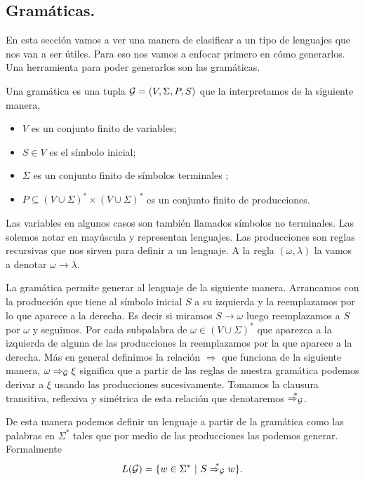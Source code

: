 \documentclass[tesis.tex]{subfiles}
\begin{document}
\subsection{Gramáticas.}
En esta sección vamos a ver una manera de clasificar a un tipo de lenguajes que nos van a ser útiles. Para eso nos vamos a enfocar primero en cómo generarlos. Una herramienta para poder generarlos son las gramáticas.

\begin{deff}
	Una gramática es una tupla ${\cal G} = (V, \Sigma, P, S)$ que la interpretamos de la siguiente manera,
\begin{itemize}
		\item $V$ es un conjunto finito de variables;
		\item $S \in V$ es el símbolo inicial;
		\item $\Sigma$ es un conjunto finito de símbolos terminales ;
		\item $P \subseteq (V \cup \Sigma)^* \times (V \cup \Sigma)^*$ es un conjunto finito de producciones.
\end{itemize}
\end{deff}

Las variables en algunos casos son también llamados símbolos no terminales. Las solemos notar en mayúscula y representan lenguajes. Las producciones son reglas recursivas que nos sirven para definir a un lenguaje. A la regla $(\omega, \lambda)$ la vamos a denotar $\omega \to \lambda$.

La gramática permite generar al lenguaje de la siguiente manera. Arrancamos con la producción que tiene al símbolo inicial $S$ a su izquierda y la reemplazamos por lo que aparece a la derecha. Es decir si miramos $S \to \omega$ luego reemplazamos a $S$ por $\omega$ y seguimos. Por cada subpalabra de $\omega\in (V \cup \Sigma)^*$ que aparezca a la izquierda de alguna de las producciones la reemplazamos por la que aparece a la derecha. Más en general definimos la relación $\Rightarrow$ que funciona de la siguiente manera, $\omega \Rightarrow_{\cal G} \xi$ significa que a partir de las reglas de nuestra gramática podemos derivar a $\xi$ usando las producciones sucesivamente. Tomamos la clausura transitiva, reflexiva y simétrica de esta relación que denotaremos $\overset{*}{\Rightarrow_{\cal G}}$.


De esta manera podemos definir un lenguaje a partir de la gramática como las palabras en $\Sigma^*$ tales que por medio de las producciones las podemos generar. Formalmente
\[
L({\cal G}) = \{ w \in \Sigma^* \ | \ S \overset{*}{\Rightarrow_{\cal G}} w   \}.
\]
\end{document}
